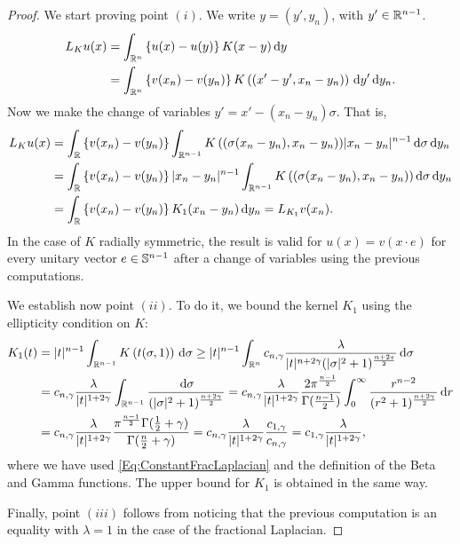 \begin{proof}
	We start proving point $(i)$. We write $y=(y',y_n)$, with $y'\in \mathbb{R}^{n-1}$.
	\begin{align*}
	L_K u(x) &= \int_{\mathbb{R}^n} \left\{ u(x)-u(y) \right\} K(x-y) \,\mathrm{d} y \\
	&=\int_{\mathbb{R}^n} \left\{ v(x_n)-v(y_n) \right\} K\left((x'-y',x_n-y_n)\right) \,\mathrm{d} y' \,\mathrm{d} y_n.
	\end{align*}
	Now we make the change of variables $y' = x'-(x_n-y_n)\sigma$. That is,
	\begin{align*}
	L_K u(x) &= \int_{\mathbb{R}} \left\{ v(x_n)-v(y_n) \right\} \int_{\mathbb{R}^{n-1}} K\left((\sigma(x_n-y_n),x_n-y_n\right)) |x_n-y_n|^{n-1} \,\mathrm{d} \sigma \,\mathrm{d} y_n \\
	&= \int_{\mathbb{R}} \left\{ v(x_n)-v(y_n) \right\} |x_n-y_n|^{n-1} \int_{\mathbb{R}^{n-1}} K\left((\sigma(x_n-y_n),x_n-y_n\right)) \,\mathrm{d}\sigma \,\mathrm{d} y_n \\
	&= \int_{\mathbb{R}} \left\{ v(x_n)-v(y_n) \right\} K_1(x_n-y_n ) \,\mathrm{d} y_n = L_{K_1}v(x_n).
	\end{align*}
	In the case of $K$ radially symmetric, the result is valid for $u(x) = v(x\cdot e)$ for every unitary vector $e\in \mathbb{S}^{n-1}$ after a change of variables using the previous computations.
	
	We establish now point $(ii)$. To do it, we bound the kernel $K_1$ using the ellipticity condition on $K$:
	\begin{align*}
	K_1(t) &= |t|^{n-1} \int_{\mathbb{R}^{n-1}} K\left(t(\sigma,1)\right) \,\mathrm{d}\sigma \geq |t|^{n-1} \int_{\mathbb{R}^n} c_{n,\gamma} \frac{\lambda}{|t|^{n+2\gamma}(|\sigma|^2+1)^{\frac{n+2s}{2}}} \,\mathrm{d}\sigma \\
	&= c_{n,\gamma} \frac{\lambda}{|t|^{1+2\gamma}} \int_{\mathbb{R}^{n-1}} \frac{\,\mathrm{d}\sigma}{(|\sigma|^2+1)^{\frac{n+2\gamma}{2}}} = c_{n,\gamma} \frac{\lambda}{|t|^{1+2\gamma}} \dfrac{2 \pi^{\frac{n-1}{2}}}{\Gamma(\frac{n-1}{2})} \int_0^\infty \dfrac{r^{n-2}}{(r^2+1)^{\frac{n+2\gamma}{2}}} \,\mathrm{d} r \\	
	& = c_{n,\gamma} \frac{\lambda}{|t|^{1+2\gamma}} 
	\dfrac{\pi^{\frac{n-1}{2}} \Gamma(\frac{1}{2}+\gamma)}{\Gamma(\frac{n}{2}+\gamma)} 
	= c_{n,\gamma} \frac{\lambda}{|t|^{1+2\gamma}} \frac{c_{1,\gamma}}{c_{n,\gamma}} = c_{1,\gamma} \frac{\lambda}{|t|^{1+2\gamma}},
	\end{align*}
	where we have used \eqref{Eq:ConstantFracLaplacian} and the definition of the Beta and Gamma functions. The upper bound for $K_1$ is obtained in the same way.
	
	Finally, point $(iii)$ follows from noticing that the previous computation is an equality with $\lambda = 1$ in the case of the fractional Laplacian.
\end{proof}





